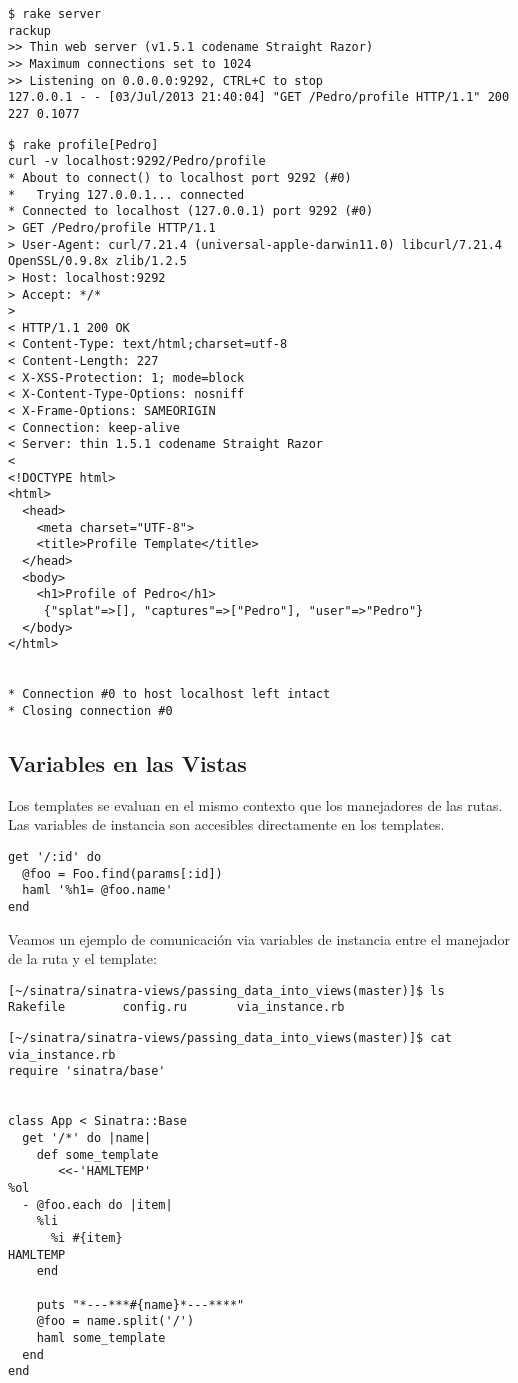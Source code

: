 \begin{verbatim}
$ rake server
rackup
>> Thin web server (v1.5.1 codename Straight Razor)
>> Maximum connections set to 1024
>> Listening on 0.0.0.0:9292, CTRL+C to stop
127.0.0.1 - - [03/Jul/2013 21:40:04] "GET /Pedro/profile HTTP/1.1" 200 227 0.1077
\end{verbatim}


\begin{verbatim}
$ rake profile[Pedro]
curl -v localhost:9292/Pedro/profile
* About to connect() to localhost port 9292 (#0)
*   Trying 127.0.0.1... connected
* Connected to localhost (127.0.0.1) port 9292 (#0)
> GET /Pedro/profile HTTP/1.1
> User-Agent: curl/7.21.4 (universal-apple-darwin11.0) libcurl/7.21.4 OpenSSL/0.9.8x zlib/1.2.5
> Host: localhost:9292
> Accept: */*
> 
< HTTP/1.1 200 OK
< Content-Type: text/html;charset=utf-8
< Content-Length: 227
< X-XSS-Protection: 1; mode=block
< X-Content-Type-Options: nosniff
< X-Frame-Options: SAMEORIGIN
< Connection: keep-alive
< Server: thin 1.5.1 codename Straight Razor
< 
<!DOCTYPE html>
<html> 
  <head>
    <meta charset="UTF-8">
    <title>Profile Template</title> 
  </head>
  <body> 
    <h1>Profile of Pedro</h1>
     {"splat"=>[], "captures"=>["Pedro"], "user"=>"Pedro"}
  </body> 
</html>


* Connection #0 to host localhost left intact
* Closing connection #0
\end{verbatim}

\subsection{Variables en las Vistas}

Los templates se evaluan en el mismo contexto que los manejadores de las rutas.
Las variables de instancia son accesibles directamente en los templates.

\begin{verbatim}
get '/:id' do
  @foo = Foo.find(params[:id])
  haml '%h1= @foo.name'
end
\end{verbatim}
Veamos un ejemplo de comunicación via variables de instancia entre el manejador de la ruta
y el template:

\begin{verbatim}
[~/sinatra/sinatra-views/passing_data_into_views(master)]$ ls
Rakefile        config.ru       via_instance.rb
\end{verbatim}


\begin{verbatim}
[~/sinatra/sinatra-views/passing_data_into_views(master)]$ cat via_instance.rb 
require 'sinatra/base'


class App < Sinatra::Base
  get '/*' do |name|
    def some_template
       <<-'HAMLTEMP'
%ol
  - @foo.each do |item|
    %li 
      %i #{item}
HAMLTEMP
    end

    puts "*---***#{name}*---****"
    @foo = name.split('/')
    haml some_template
  end
end
\end{verbatim}

